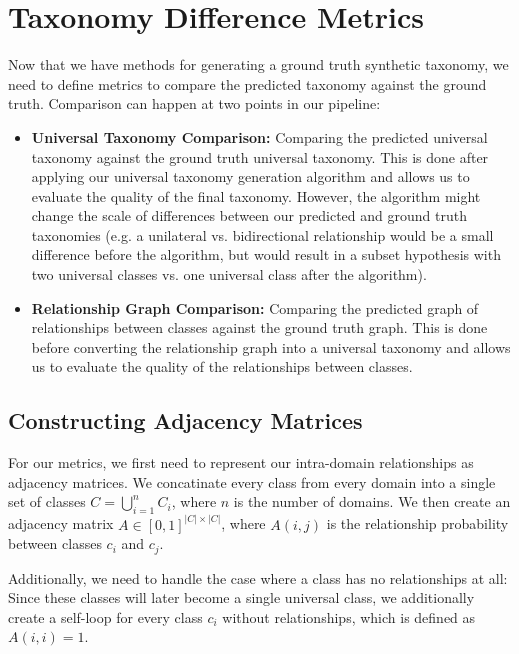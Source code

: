 \section{Taxonomy Difference Metrics}

Now that we have methods for generating a ground truth synthetic taxonomy,
we need to define metrics to compare the predicted taxonomy against the ground truth.
Comparison can happen at two points in our pipeline:
\begin{itemize}
    \item \textbf{Universal Taxonomy Comparison:} Comparing the predicted universal taxonomy against the ground truth universal taxonomy.
          This is done after applying our universal taxonomy generation algorithm
          and allows us to evaluate the quality of the final taxonomy.
          However, the algorithm might change the scale of differences between our predicted and ground truth taxonomies
          (e.g. a unilateral vs. bidirectional relationship would be a small difference before the algorithm,
          but would result in a subset hypothesis with two universal classes vs. one universal class after the algorithm).
    \item \textbf{Relationship Graph Comparison:} Comparing the predicted graph of relationships between classes against the ground truth graph.
          This is done before converting the relationship graph into a universal taxonomy
          and allows us to evaluate the quality of the relationships between classes.
\end{itemize}

\subsection{Constructing Adjacency Matrices}

For our metrics, we first need to represent our intra-domain relationships as adjacency matrices.
We concatinate every class from every domain into a single set of classes $C = \bigcup_{i=1}^n C_i$,
where $n$ is the number of domains.
We then create an adjacency matrix $A\in [0, 1]^{|C|\times|C|}$,
where $A(i,j)$ is the relationship probability between classes $c_i$ and $c_j$.

Additionally, we need to handle the case where a class has no relationships at all:
Since these classes will later become a single universal class,
we additionally create a self-loop for every class $c_i$ without relationships,
which is defined as $A(i,i) = 1$.

